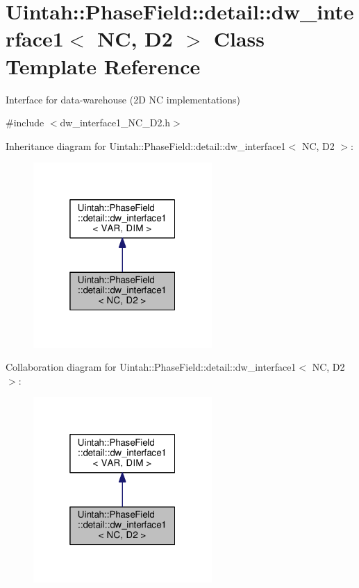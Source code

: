 \hypertarget{classUintah_1_1PhaseField_1_1detail_1_1dw__interface1_3_01NC_00_01D2_01_4}{}\section{Uintah\+:\+:Phase\+Field\+:\+:detail\+:\+:dw\+\_\+interface1$<$ NC, D2 $>$ Class Template Reference}
\label{classUintah_1_1PhaseField_1_1detail_1_1dw__interface1_3_01NC_00_01D2_01_4}


Interface for data-\/warehouse (2D NC implementations)  




{\ttfamily \#include $<$dw\+\_\+interface1\+\_\+\+N\+C\+\_\+\+D2.\+h$>$}



Inheritance diagram for Uintah\+:\+:Phase\+Field\+:\+:detail\+:\+:dw\+\_\+interface1$<$ NC, D2 $>$\+:\nopagebreak
\begin{figure}[H]
\begin{center}
\leavevmode
\includegraphics[width=193pt]{classUintah_1_1PhaseField_1_1detail_1_1dw__interface1_3_01NC_00_01D2_01_4__inherit__graph}
\end{center}
\end{figure}


Collaboration diagram for Uintah\+:\+:Phase\+Field\+:\+:detail\+:\+:dw\+\_\+interface1$<$ NC, D2 $>$\+:\nopagebreak
\begin{figure}[H]
\begin{center}
\leavevmode
\includegraphics[width=193pt]{classUintah_1_1PhaseField_1_1detail_1_1dw__interface1_3_01NC_00_01D2_01_4__coll__graph}
\end{center}
\end{figure}
